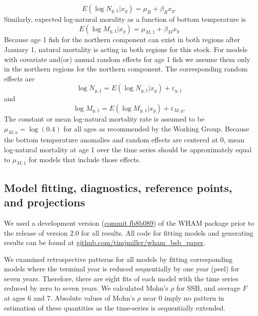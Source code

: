 \documentclass[
]{article}
\begin{document}
\begin{equation}\label{eq:expected-recruitment}
E\left(\log N_{y,1}|x_y\right) = \mu_{R} + \beta_{R} x_y.
\end{equation} Similarly, expected log-natural morality as a function of
bottom temperature is \begin{equation}\label{eq:expected-M1}
E\left(\log M_{y,1}|x_y\right) = \mu_{M,1} + \beta_{M} x_y
\end{equation} Because age 1 fish for the northern component can exist
in both regions after January 1, natural mortality is acting in both
regions for this stock. For models with covariate and(or) annual random
effects for age 1 fish we assume them only in the northern regions for
the northern component. The corresponding random effects are
\begin{equation}\label{eq:Rec-re}
\log N_{y,1} = E\left(\log N_{y,1}|x_y\right) + \varepsilon_{y,1}
\end{equation} and \begin{equation}\label{eq:M-re}
\log M_{y,1} = E\left(\log M_{y,1}|x_y\right) + \varepsilon_{M,y}.
\end{equation} The constant or mean log-natural mortality rate is
assumed to be \(\mu_{M,a} = \log(0.4)\) for all ages as recommended by
the Working Group. Because the bottom temperature anomalies and random
effects are centered at 0, mean log-natural mortality at age 1 over the
time series should be approximately equal to \(\mu_{M,1}\) for models
that include those effects.

\hypertarget{model-fitting-diagnostics-reference-points-and-projections}{%
\subsection*{Model fitting, diagnostics, reference points, and
projections}\label{model-fitting-diagnostics-reference-points-and-projections}}

We used a development version
(\href{https://github.com/timjmiller/wham/tree/fb8b089}{commit fb8b089})
of the WHAM package prior to the release of version 2.0 for all results.
All code for fitting models and generating results can be found at
\href{https://github.com/timjmiller/wham_bsb_paper}{github.com/timjmiller/wham\_bsb\_paper}.

We examined retrospective patterns for all models by fitting
corresponding models where the terminal year is reduced sequentially by
one year (peel) for seven years. Therefore, there are eight fits of each
model with the time series reduced by zero to seven years. We calculated
Mohn's \(\rho\) for SSB, and average \(F\) at ages 6 and 7. Absolute
values of Mohn's \(\rho\) near 0 imply no pattern in estimation of these
quantities as the time-series is sequentially extended.
\end{document}
